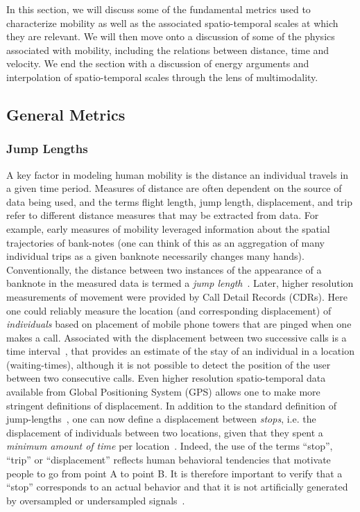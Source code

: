 In this section, we will discuss some of the fundamental metrics used to characterize mobility as well as the associated spatio-temporal scales at which they are relevant. We will then move onto a discussion of some of the physics associated with mobility, including the relations between distance, time and velocity. We end the section with a discussion of energy arguments and interpolation of spatio-temporal scales through the lens of multimodality. 

\subsection{General Metrics} \label{sec:metrics}

\subsubsection{Jump Lengths}

A key factor in modeling human mobility is the distance an individual travels in a given time period. Measures of distance are often dependent on the source of data being used, and the terms flight length, jump length, displacement, and trip refer to different distance measures that may be extracted from data. For example, early measures of mobility leveraged information about the spatial trajectories of bank-notes (one can think of this as an aggregation of many individual trips as a given banknote necessarily changes many hands). Conventionally, the distance between two instances of the appearance of a banknote in the measured data is termed a \emph{jump length}~\cite{brockmann_2006_scaling}. Later, higher resolution measurements of movement were provided by Call Detail Records (CDRs). Here one could reliably measure the location (and corresponding displacement) of \emph{individuals} based on placement of mobile phone towers that are pinged when one makes a call. Associated with the displacement between two successive calls is a time interval~\cite{gonzalez_2008_understanding}, that provides an estimate of the stay of an individual in a location (waiting-times), although it is not possible to detect the position of the user between two consecutive calls. Even higher resolution spatio-temporal data available from Global Positioning System (GPS) allows one to make more stringent definitions of displacement. In addition to the standard definition of jump-lengths~\cite{shin_2008_levy}, one can now define a displacement between \emph{stops}, i.e. the displacement of individuals between two locations, given that they spent a \emph{minimum amount of time} per location~\cite{bazzani_2010_statistical}. 
Indeed, the use of the terms ``stop'', ``trip'' or ``displacement'' reflects human behavioral tendencies that motivate people to go from point A to point B. It is therefore important to verify that a ``stop'' corresponds to an actual behavior and that it is not artificially generated by oversampled or undersampled signals~\cite{turchin_1998_quantitative}. 

